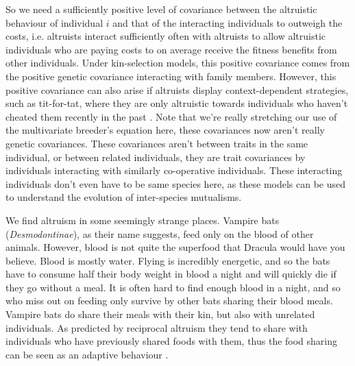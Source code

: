 So we need a sufficiently positive level of covariance between the
altruistic behaviour of individual $i$ and that of the interacting
individuals to outweigh the costs, i.e. altruists interact
sufficiently often with altruists to allow altruistic individuals who are paying costs to on average
receive the fitness benefits from other individuals.  Under kin-selection models, this positive covariance comes from the positive
genetic covariance interacting with family members. However, this positive covariance can also arise
if altruists display context-dependent strategies, such as tit-for-tat, where they are only
altruistic towards individuals who haven't cheated them recently in the
past \citep{queller2011expanded}. Note that we're really stretching
our use of the multivariate breeder's equation here, these covariances
now aren't really genetic covariances. These covariances aren't
between traits in the same individual, or between related individuals,
they are trait covariances by individuals interacting with similarly
co-operative individuals. These interacting individuals don't even
have to be same species here, as these models can be used to
understand the evolution of inter-species mutualisms.

We find altruism in some seemingly strange places. Vampire bats ({\it Desmodontinae}), as their name suggests, feed only on the blood of other animals. 
However, blood is not quite the superfood that Dracula would have you
believe. Blood is mostly water. Flying is incredibly energetic, and
so the bats have to consume half their body weight in blood a night and
will quickly die if they go without a meal. It is often hard to find
enough blood in a night, and so who miss out on feeding only survive by
other bats sharing their blood meals. Vampire bats do share their
meals with their kin, but also with unrelated individuals. As
predicted by reciprocal altruism they tend to share with individuals
who have previously shared foods with them, thus the food sharing can be
seen as an adaptive behaviour \citep{wilkinson1984reciprocal,carter2013food}.  



